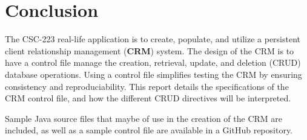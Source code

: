 \section{Conclusion}
The CSC-223 real-life application is to create, populate, and utilize a  persistent client relationship management (\textbf{CRM}) system.  The design of the CRM is to have a control file manage the creation, retrieval, update, and deletion (CRUD) database operations.  Using a control file simplifies  testing the CRM by ensuring consistency and reproduciability.  This report details the specifications of the CRM control file, and how the different CRUD directives will be interpreted.

Sample Java source files that maybe of use in the creation of the CRM are included, as well as a sample control file are available in a GitHub repository.
